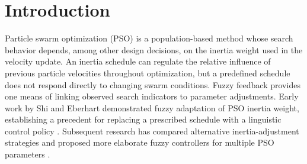 %
\section{Introduction}
Particle swarm optimization (PSO) is a population-based method whose search behavior depends, among other design decisions, on the inertia weight used in the velocity update. An inertia schedule can regulate the relative influence of previous particle velocities throughout optimization, but a predefined schedule does not respond directly to changing swarm conditions. Fuzzy feedback provides one means of linking observed search indicators to parameter adjustments. Early work by Shi and Eberhart demonstrated fuzzy adaptation of PSO inertia weight, establishing a precedent for replacing a prescribed schedule with a linguistic control policy \cite{ShiEberhart2001}. Subsequent research has compared alternative inertia-adjustment strategies and proposed more elaborate fuzzy controllers for multiple PSO parameters \cite{Valdez2017,Xia2023,Roy2024}.

